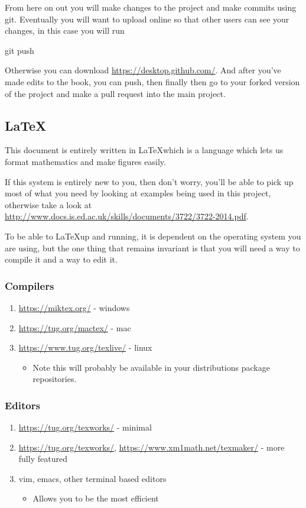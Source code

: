From here on out you will make changes to the project and make commits using git. Eventually you will want to upload online so that other users can see your changes, in this case you will run 

\begin{term}
git push
\end{term}

Otherwise you can download \url{https://desktop.github.com/}. And after you've made edits to the book, you can push, then finally then go to your forked version of the project and make a pull request into the main project.

\subsection*{\LaTeX}

This document is entirely written in \LaTeX which is a language which lets us format mathematics and make figures easily.

If this system is entirely new to you, then don't worry, you'll be able to pick up most of what you need by looking at examples being used in this project, otherwise take a look at \url{http://www.docs.is.ed.ac.uk/skills/documents/3722/3722-2014.pdf}.

To be able to \LaTeX up and running, it is dependent on the operating system you are using, but the one thing that remains invariant is that you will need a way to compile it and a way to edit it.

\subsubsection*{Compilers}
\begin{enumerate}
    \item \url{https://miktex.org/} - windows
    \item \url{https://tug.org/mactex/} - mac
    \item \url{https://www.tug.org/texlive/} - linux 
    \begin{itemize}
        \item Note this will probably be available in your distributions package repositories.
    \end{itemize}
\end{enumerate}

\subsubsection*{Editors}
\begin{enumerate}
   \item \url{https://tug.org/texworks/} - minimal
   \item \url{https://tug.org/texworks/}, \url{https://www.xm1math.net/texmaker/} - more fully featured
    \item vim, emacs, other terminal based editors
    \begin{itemize}
        \item Allows you to be the most efficient
    \end{itemize}
\end{enumerate}

